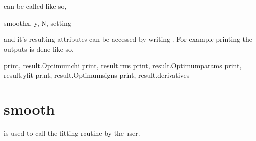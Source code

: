 \documentclass[letterpaper,10pt,english]{sphinxmanual}
\begin{document}
 can be called like so,

\begin{sphinxVerbatim}[commandchars=\\\{\}]
  smoothx, y, N, setting
\end{sphinxVerbatim}

and it’s resulting attributes can be accessed by writing
. For example printing the outputs is done like
so,

\begin{sphinxVerbatim}[commandchars=\\\{\}]
print, result.Optimum\PYGZus{}chi
print, result.rms
print, result.Optimum\PYGZus{}params
print, result.y\PYGZus{}fit
print, result.Optimum\PYGZus{}signs
print, result.derivatives
\end{sphinxVerbatim}


\section{smooth}
\label{\detokenize{source/maxsmooth:module-maxsmooth.msf}}\label{\detokenize{source/maxsmooth:smooth}}
 is used to call the fitting routine by the user.
\end{document}
